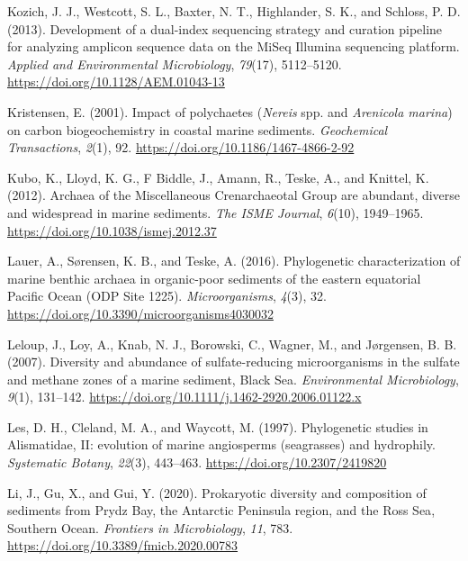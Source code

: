 \documentclass[
  12 pt,
]{book}
\newlength{\cslhangindent}
\newlength{\cslentryspacingunit} %
\newenvironment{CSLReferences}[2] %
 {%
  \setlength{\parindent}{0pt}
  \ifodd #1
  \let\oldpar\par
  \def\par{\hangindent=\cslhangindent\oldpar}
  \fi
  \setlength{\parskip}{#2\cslentryspacingunit}
 }%
 {}
\begin{document}
\begin{CSLReferences}{1}{0}
\leavevmode{}%
Kozich, J. J., Westcott, S. L., Baxter, N. T., Highlander, S. K., and Schloss, P. D. (2013). Development of a dual-index sequencing strategy and curation pipeline for analyzing amplicon sequence data on the {MiSeq Illumina} sequencing platform. \emph{Applied and Environmental Microbiology}, \emph{79}(17), 5112--5120. \url{https://doi.org/10.1128/AEM.01043-13}

\leavevmode{}%
Kristensen, E. (2001). Impact of polychaetes ({{{\emph{Nereis}}} spp. }and {{\emph{Arenicola marina}}}) on carbon biogeochemistry in coastal marine sediments. \emph{Geochemical Transactions}, \emph{2}(1), 92. \url{https://doi.org/10.1186/1467-4866-2-92}

\leavevmode{}%
Kubo, K., Lloyd, K. G., F Biddle, J., Amann, R., Teske, A., and Knittel, K. (2012). Archaea of the {Miscellaneous Crenarchaeotal Group} are abundant, diverse and widespread in marine sediments. \emph{The ISME Journal}, \emph{6}(10), 1949--1965. \url{https://doi.org/10.1038/ismej.2012.37}

\leavevmode{}%
Lauer, A., Sørensen, K. B., and Teske, A. (2016). Phylogenetic characterization of marine benthic archaea in organic-poor sediments of the eastern equatorial {Pacific Ocean} ({ODP Site} 1225). \emph{Microorganisms}, \emph{4}(3), 32. \url{https://doi.org/10.3390/microorganisms4030032}

\leavevmode{}%
Leloup, J., Loy, A., Knab, N. J., Borowski, C., Wagner, M., and Jørgensen, B. B. (2007). Diversity and abundance of sulfate-reducing microorganisms in the sulfate and methane zones of a marine sediment, {Black Sea}. \emph{Environmental Microbiology}, \emph{9}(1), 131--142. \url{https://doi.org/10.1111/j.1462-2920.2006.01122.x}

\leavevmode{}%
Les, D. H., Cleland, M. A., and Waycott, M. (1997). Phylogenetic studies in {Alismatidae}, {II}: evolution of marine angiosperms (seagrasses) and hydrophily. \emph{Systematic Botany}, \emph{22}(3), 443--463. \url{https://doi.org/10.2307/2419820}

\leavevmode{}%
Li, J., Gu, X., and Gui, Y. (2020). Prokaryotic diversity and composition of sediments from {Prydz Bay}, the {Antarctic Peninsula} region, and the {Ross Sea}, {Southern Ocean}. \emph{Frontiers in Microbiology}, \emph{11}, 783. \url{https://doi.org/10.3389/fmicb.2020.00783}


\end{CSLReferences}
\end{document}
